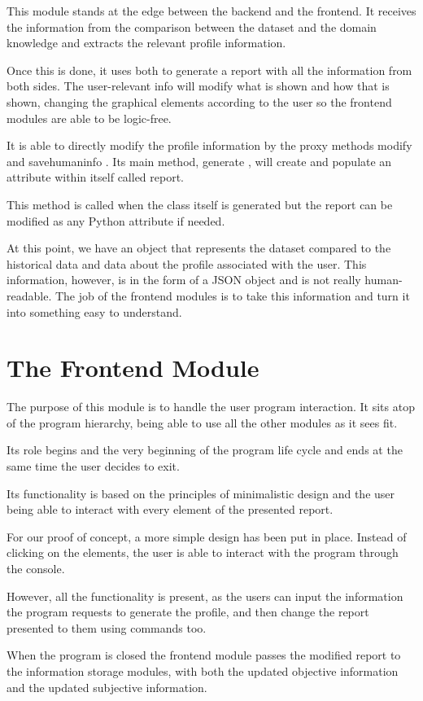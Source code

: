 This module stands at the edge between the backend and the frontend. It receives the information from the comparison between the dataset and the domain knowledge and extracts the relevant profile information.

Once this is done, it uses both to generate a report with all the information from both sides. The user-relevant info will modify what is shown and  how  that is shown, changing the graphical elements according to the user so the frontend modules are able to be logic-free.

It is able to directly modify the profile information by the proxy methods  modify  and  savehumaninfo . Its main method,  generate , will create and populate an attribute within itself called report.

This method is called when the class itself is generated but the report can be modified as any Python attribute if needed.

At this point, we have an object that represents the dataset compared to the historical data and data about the profile associated with the user. This information, however, is in the form of a JSON object and is not really human-readable. The job of the frontend modules is to take this information and turn it into something easy to understand.

\section{The Frontend Module}
\label{cap2:sec:frontend}

The purpose of this module is to handle the user program interaction. It sits atop of the program hierarchy, being able to use all the other modules as it sees fit.

Its role begins and the very beginning of the program life cycle and ends at the same time the user decides to exit. 

Its functionality is based on the principles of minimalistic design and the user being able to interact with every element of the presented report.

For our proof of concept, a more simple design has been put in place. Instead of clicking on the elements, the user is able to interact with the program through the console.

However, all the functionality is present, as the users can input the information the program requests to generate the profile, and then change the report presented to them using commands too.

When the program is closed the frontend module passes the modified report to the information storage modules, with both the updated objective information and the updated subjective information.